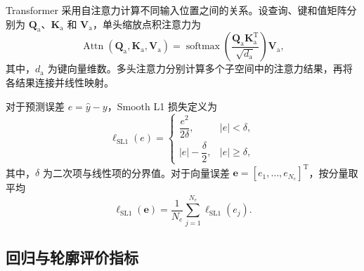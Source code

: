 Transformer 采用自注意力计算不同输入位置之间的关系。设查询、键和值矩阵分别为 $\boldsymbol{Q}_{\mathrm a}$、$\boldsymbol{K}_{\mathrm a}$ 和 $\boldsymbol{V}_{\mathrm a}$，单头缩放点积注意力为
\begin{equation}
\operatorname{Attn}
\left(
\boldsymbol{Q}_{\mathrm a},
\boldsymbol{K}_{\mathrm a},
\boldsymbol{V}_{\mathrm a}
\right)
=
\operatorname{softmax}
\left(
\frac{
\boldsymbol{Q}_{\mathrm a}\boldsymbol{K}_{\mathrm a}^{\mathrm T}}
{\sqrt{d_{\mathrm a}}}
\right)
\boldsymbol{V}_{\mathrm a},
\label{eq:ch2_attention}
\end{equation}
其中，$d_{\mathrm a}$ 为键向量维数。多头注意力分别计算多个子空间中的注意力结果，再将各结果连接并线性映射\cite{vaswani2017attention}。

对于预测误差 $e=\widehat y-y$，Smooth L1 损失定义为
\begin{equation}
\ell_{\mathrm{SL1}}(e)
=
\begin{cases}
\dfrac{e^2}{2\delta}, & |e|<\delta,\\[5pt]
|e|-\dfrac{\delta}{2}, & |e|\geq\delta,
\end{cases}
\label{eq:ch2_smooth_l1}
\end{equation}
其中，$\delta$ 为二次项与线性项的分界值。对于向量误差 $\boldsymbol{e}=[e_1,\ldots,e_{N_e}]^{\mathrm T}$，按分量取平均
\begin{equation}
\ell_{\mathrm{SL1}}(\boldsymbol{e})
=
\frac{1}{N_e}
\sum_{j=1}^{N_e}
\ell_{\mathrm{SL1}}(e_j).
\label{eq:ch2_smooth_l1_vector}
\end{equation}

\subsection{回归与轮廓评价指标}

